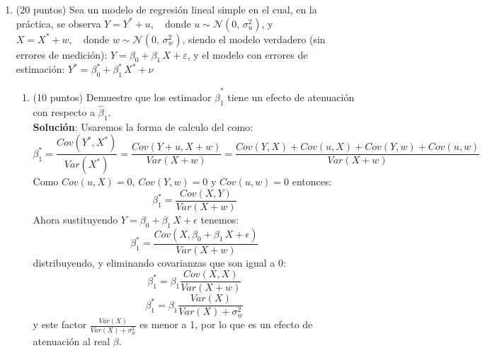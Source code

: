 \documentclass[10pt,a4paper]{article}
\begin{document}
\begin{enumerate}
\begin{enumerate}
    \item (5 puntos) Con toda la información disponible, ¿Qué modelo de regresión lineal propondría para estimar el promedio final en Matemática?
\\
   \textbf{solución:}
   \\ 
    $$Prom = \beta_0 + \beta_1 D + \beta_2 H + u$$\\
    
\end{enumerate}

\item (20 puntos) Sea un modelo de regresión lineal simple en el cual, en la práctica, se observa $
Y = Y^* + u, \quad \text{donde } u \sim \mathcal{N}(0,\,\sigma_u^2)$, y $
X = X^* + w, \quad \text{donde } w \sim \mathcal{N}(0,\,\sigma_w^2)$,
siendo el modelo verdadero (sin errores de medición): $
Y = \beta_0 + \beta_1 \, X + \varepsilon$, y el modelo con errores de estimación: $
Y^* = \beta^*_0 + \beta^*_1 \, X^* + \nu$
\begin{enumerate}
    \item (10 puntos) Demuestre que los estimador $\hat{\beta}^*_1$ tiene un efecto de atenuación con respecto a $\hat{\beta}_1$. 
    \\
    \textbf{Solución}: Usaremos la forma de calculo del como:
    $$\beta^*_1 = \frac{Cov(Y^*,X^*)}{Var(X^*)} = \frac{Cov(Y+u,X+w)}{Var(X+w)}=\frac{Cov(Y,X)+Cov(u,X)+Cov(Y,w)+Cov(u,w)}{Var(X+w)}$$
    Como $Cov(u,X)=0$, $Cov(Y,w)=0$ y $Cov(u,w)=0$ entonces:
    $$\beta^*_1=\frac{Cov(X,Y)}{Var(X+w)}$$
    Ahora sustituyendo $Y= \beta_0 + \beta_1 \, X +\epsilon$ tenemos:
    $$\beta^*_1=\frac{Cov(X,\beta_0 + \beta_1 \, X+\epsilon)}{Var(X+w)}$$
    distribuyendo, y eliminando covarianzas que son igual a 0:
    $$\beta^*_1=\beta_1\frac{Cov(X,X)}{Var(X+w)}$$
    $$\beta^*_1=\beta_1\frac{Var(X)}{Var(X) + \sigma^2_w}$$
    y este factor $\frac{Var(X)}{Var(X) + \sigma^2_w}$ es menor a 1, por lo que es un efecto de atenuación al real $\beta$.


\end{enumerate}
\end{enumerate}
\end{document}
